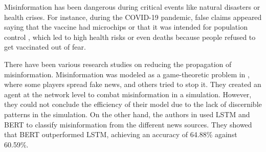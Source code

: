 Misinformation has been dangerous during critical events like natural disasters or health crises. For instance, during the COVID-19 pandemic, false claims appeared saying that the vaccine had
microchips or that it was intended for population control \cite{article_vaccine}, which led to high health risks or even deaths \cite{article} because people refused to get vaccinated out of fear. 

There have been various research studies on reducing the propagation of misinformation. Misinformation was modeled as a game-theoretic problem in \cite{9906925}, where some players spread fake news, and others tried
to stop it. They created an agent at the network level to combat misinformation in a simulation. However, they could not conclude the efficiency of their model due to the lack of discernible patterns in the simulation. On
the other hand, the authors in \cite{10100054} used LSTM and BERT to classify misinformation from the different news sources. They showed that BERT outperformed LSTM, achieving an accuracy of 64.88\% against 60.59\%. 


